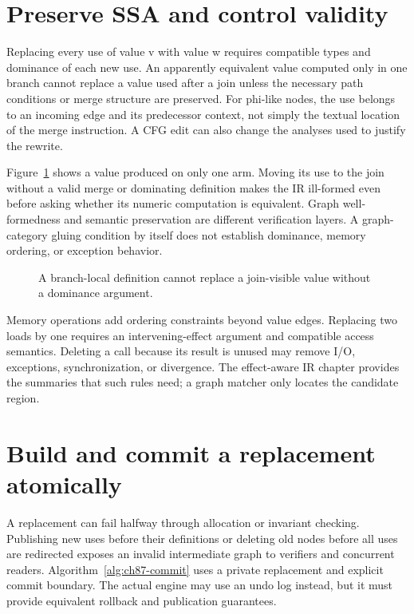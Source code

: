 \section{Preserve SSA and control validity}
\label{sec:ch87-ssa}
Replacing every use of value v with value w requires compatible types and dominance of each new use.
An apparently equivalent value computed only in one branch cannot replace a value used after a join unless the necessary path conditions or merge structure are preserved.
For phi-like nodes, the use belongs to an incoming edge and its predecessor context, not simply the textual location of the merge instruction.
A CFG edit can also change the analyses used to justify the rewrite.

Figure~\ref{fig:ch87-dominance} shows a value produced on only one arm.
Moving its use to the join without a valid merge or dominating definition makes the IR ill-formed even before asking whether its numeric computation is equivalent.
Graph well-formedness and semantic preservation are different verification layers.
A graph-category gluing condition by itself does not establish dominance, memory ordering, or exception behavior.

\begin{figure}[htbp]
\centering
{}
\caption{A branch-local definition cannot replace a join-visible value without a dominance argument.}
\label{fig:ch87-dominance}
\end{figure}

Memory operations add ordering constraints beyond value edges.
Replacing two loads by one requires an intervening-effect argument and compatible access semantics.
Deleting a call because its result is unused may remove I/O, exceptions, synchronization, or divergence.
The effect-aware IR chapter provides the summaries that such rules need; a graph matcher only locates the candidate region.

\section{Build and commit a replacement atomically}
\label{sec:ch87-transaction}
A replacement can fail halfway through allocation or invariant checking.
Publishing new uses before their definitions or deleting old nodes before all uses are redirected exposes an invalid intermediate graph to verifiers and concurrent readers.
Algorithm~\ref{alg:ch87-commit} uses a private replacement and explicit commit boundary.
The actual engine may use an undo log instead, but it must provide equivalent rollback and publication guarantees.

